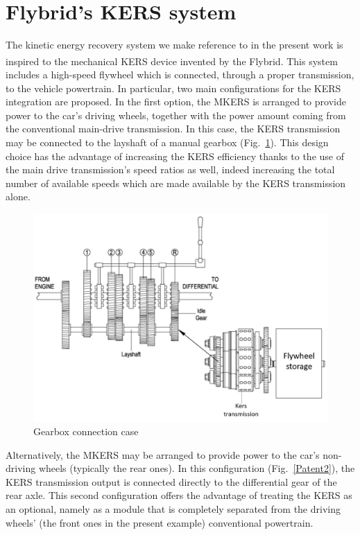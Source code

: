 \documentclass[11pt]{article}
\begin{document}
\section{Flybrid's KERS system}

The kinetic energy recovery system we make reference to in the present work is inspired to the mechanical KERS device invented by the Flybrid\textsuperscript\textregistered \cite{n}. This system includes a high-speed flywheel which is connected, through a proper transmission, to the vehicle powertrain. In particular, two main configurations for the KERS integration are proposed. In the first option, the MKERS is arranged to provide power to the car’s driving wheels, together with the power amount coming from the conventional main-drive transmission. In this case, the KERS transmission may be connected to the layshaft of a manual gearbox (Fig.~\ref{Patent1}). This design choice has the advantage of increasing the KERS efficiency thanks to the use of the main drive transmission’s speed ratios as well, indeed increasing the total number of available speeds which are made available by the KERS transmission alone. 

\begin{figure}[H]
\centering
\includegraphics[width=.7\textwidth]{Images/State_of_the_art/Patent1}
\caption{Gearbox connection case}
\label{Patent1}
\end{figure}

Alternatively, the MKERS may be arranged to provide power to the car’s non-driving wheels (typically the rear ones). In this configuration (Fig.~\ref{Patent2}), the KERS transmission output is connected directly to the differential gear of the rear axle. This second configuration offers the advantage of treating the KERS as an optional, namely as a module that is completely separated from the driving wheels’ (the front ones in the present example) conventional powertrain.
\end{document}
